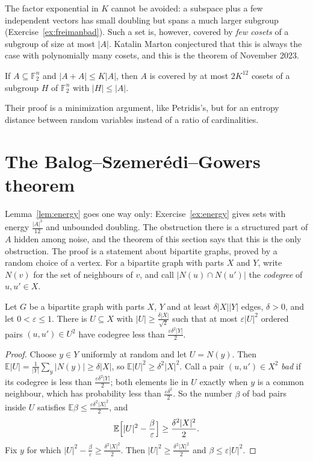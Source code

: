 The factor exponential in $K$ cannot be avoided: a subspace plus a few independent vectors has small doubling but spans a much larger subgroup (Exercise~\ref{ex:freimanbad}). Such a set is, however, covered by \emph{few cosets} of a subgroup of size at most $|A|$. Katalin Marton conjectured that this is always the case with polynomially many cosets, and this is the theorem of November 2023.

\begin{theorem}\label{thm:pfr}
If $A\subseteq\mathbb F_2^n$ and $|A+A|\le K|A|$, then $A$ is covered by at most $2K^{12}$ cosets of a subgroup $H$ of $\mathbb F_2^n$ with $|H|\le|A|$.
\end{theorem}

Their proof is a minimization argument, like Petridis's, but for an entropy distance between random variables instead of a ratio of cardinalities.

\section{The Balog--Szemerédi--Gowers theorem}

Lemma~\ref{lem:energy} goes one way only: Exercise~\ref{ex:energy} gives sets with energy $\frac{|A|^3}{12}$ and unbounded doubling. The obstruction there is a structured part of $A$ hidden among noise, and the theorem of this section says that this is the only obstruction. The proof is a statement about bipartite graphs, proved by a random choice of a vertex. For a bipartite graph with parts $X$ and $Y$, write $N(v)$ for the set of neighbours of $v$, and call $|N(u)\cap N(u')|$ the \emph{codegree} of $u,u'\in X$.

\begin{lemma}\label{lem:drc}
Let $G$ be a bipartite graph with parts $X$, $Y$ and at least $\delta|X||Y|$ edges, $\delta>0$, and let $0<\varepsilon\le1$. There is $U\subseteq X$ with $|U|\ge\frac{\delta|X|}{\sqrt2}$ such that at most $\varepsilon|U|^2$ ordered pairs $(u,u')\in U^2$ have codegree less than $\frac{\varepsilon\delta^2|Y|}2$.
\end{lemma}
\begin{proof}
Choose $y\in Y$ uniformly at random and let $U=N(y)$. Then $\mathbb E|U|=\frac1{|Y|}\sum_y|N(y)|\ge\delta|X|$, so $\mathbb E|U|^2\ge\delta^2|X|^2$. Call a pair $(u,u')\in X^2$ \emph{bad} if its codegree is less than $\frac{\varepsilon\delta^2|Y|}2$; both elements lie in $U$ exactly when $y$ is a common neighbour, which has probability less than $\frac{\varepsilon\delta^2}2$. So the number $\beta$ of bad pairs inside $U$ satisfies $\mathbb E\beta\le\frac{\varepsilon\delta^2|X|^2}2$, and
\[
\mathbb E\Bigl[|U|^2-\frac\beta\varepsilon\Bigr]\ge\frac{\delta^2|X|^2}2.
\]
Fix $y$ for which $|U|^2-\frac\beta\varepsilon\ge\frac{\delta^2|X|^2}2$. Then $|U|^2\ge\frac{\delta^2|X|^2}2$ and $\beta\le\varepsilon|U|^2$.
\end{proof}

